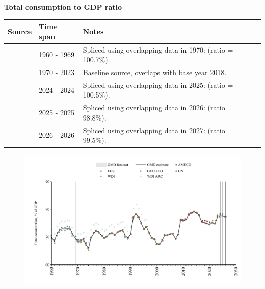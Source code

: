 \documentclass[12pt,a4paper,landscape]{article}
\begin{document}
\begin{adjustbox}{max totalsize={\paperwidth}{\paperheight},center}
\begin{minipage}[t][\textheight][t]{\textwidth}
\vspace*{0.5cm}
{}
\begin{center}
{\Large\bfseries Total consumption to GDP ratio}
\end{center}
\vspace{0.5cm}
\begin{table}[H]
\centering
\small
\begin{tabular}{|l|l|l|}
\hline
\textbf{Source} & \textbf{Time span} & \textbf{Notes} \\
\hline
\rowcolor{white}\cite{OECD_EO}& 1960 - 1969 &Spliced using overlapping data in 1970: (ratio = 100.7\%). \\
\rowcolor{lightgray}\cite{WDI}& 1970 - 2023 &Baseline source, overlaps with base year 2018. \\
\rowcolor{white}\cite{EUS}& 2024 - 2024 &Spliced using overlapping data in 2025: (ratio = 100.5\%). \\
\rowcolor{lightgray}\cite{OECD_EO}& 2025 - 2025 &Spliced using overlapping data in 2026: (ratio = 98.8\%). \\
\rowcolor{white}\cite{AMECO}& 2026 - 2026 &Spliced using overlapping data in 2027: (ratio = 99.5\%). \\
\hline
\end{tabular}
\end{table}
\begin{figure}[H]
\centering
\includegraphics[width=\textwidth,height=0.6\textheight,keepaspectratio]{graphs/FIN_cons_GDP.pdf}
\end{figure}
\end{minipage}
\end{adjustbox}
\end{document}
